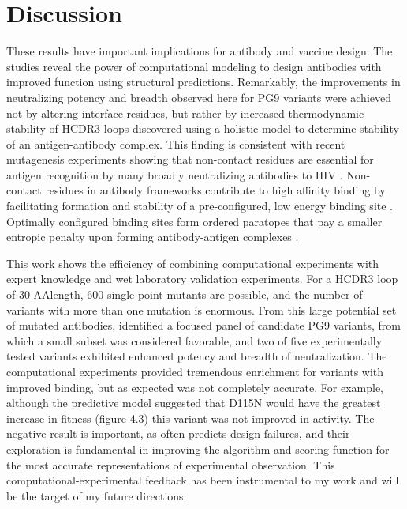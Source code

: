 \section{Discussion}
These results have important implications for antibody and vaccine design. The studies reveal the power of \rosetta computational modeling to design antibodies with improved function using structural predictions. Remarkably, the improvements in neutralizing potency and breadth observed here for PG9 variants were achieved not by altering interface residues, but rather by increased thermodynamic stability of HCDR3 loops discovered using a holistic model to determine stability of an antigen-antibody complex. This finding is consistent with recent mutagenesis experiments showing that non-contact residues are essential for antigen recognition by many broadly neutralizing antibodies to HIV \citep{Klein:2013iz}. Non-contact residues in antibody frameworks contribute to high affinity binding by facilitating formation and stability of a pre-configured, low energy binding site \citep{Willis:2013dd,Manivel:2000wk,Marlow:2010jl,Wedemayer:1997wn,Schmidt:2013ka}. Optimally configured binding sites form ordered paratopes that pay a smaller entropic penalty upon forming antibody-antigen complexes \citep{Marlow:2010jl}.

This work shows the efficiency of combining \rosettadesign computational experiments with expert knowledge and wet laboratory validation experiments. For a HCDR3 loop of 30-AAlength, 600 single point mutants are possible, and the number of variants with more than one mutation is enormous. From this large potential set of mutated antibodies, \rosettadesign identified a focused panel of candidate PG9 variants, from which a small subset was considered favorable, and two of five experimentally tested variants exhibited enhanced potency and breadth of neutralization. The computational experiments provided tremendous enrichment for variants with improved binding, but as expected was not completely accurate. For example, although the predictive model suggested that D115N would have the greatest increase in fitness (figure 4.3) this variant was not improved in activity.
The negative result is important, as \rosetta often predicts design failures, and their exploration is fundamental in improving the \rosetta algorithm and scoring function for the most accurate representations of experimental observation. This computational-experimental feedback has been instrumental to my work and will be the target of my future directions.


